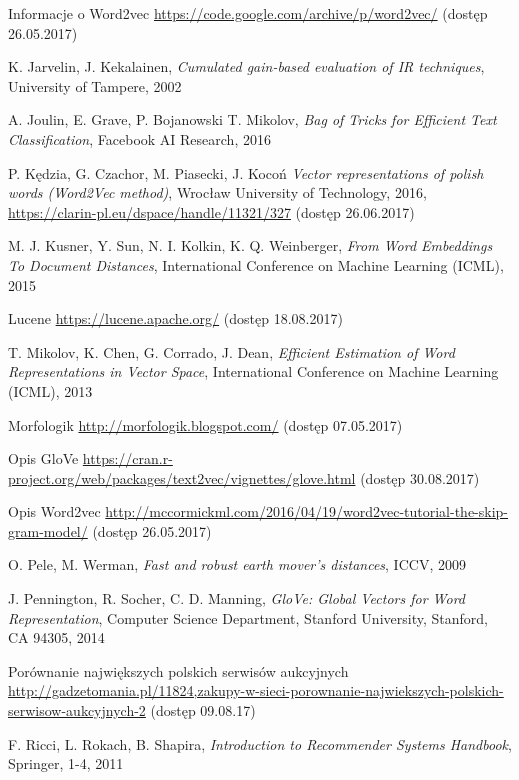 \documentclass[pl]{minipw} %
\begin{document}
\begin{thebibliography}{30}
		Informacje o Word2vec
		\url{https://code.google.com/archive/p/word2vec/}
		(dostęp 26.05.2017)
	
		K. Jarvelin, J. Kekalainen,
		\emph{Cumulated gain-based evaluation of IR techniques},
		University of Tampere,
		2002
	
		A. Joulin, E. Grave, P. Bojanowski T. Mikolov,
		\emph{Bag of Tricks for Efficient Text Classification},
		Facebook AI Research,
		2016
	
		P. Kędzia, G. Czachor, M. Piasecki, J. Kocoń
		\emph{Vector representations of polish words (Word2Vec method)},
		Wrocław University of Technology,
		2016,
		\url{https://clarin-pl.eu/dspace/handle/11321/327}
		(dostęp 26.06.2017)
	
		M. J. Kusner, Y. Sun, N. I. Kolkin, K. Q. Weinberger,
		\emph{From Word Embeddings To Document Distances},
		International Conference on Machine Learning (ICML),
		2015
	
		Lucene
		\url{https://lucene.apache.org/}
		(dostęp 18.08.2017)
	
		T. Mikolov, K. Chen, G. Corrado, J. Dean,
		\emph{Efficient Estimation of Word Representations in Vector Space},
		International Conference on Machine Learning (ICML),
		2013
	
		Morfologik
		\url{http://morfologik.blogspot.com/}
		(dostęp 07.05.2017)
	
		Opis GloVe
		\url{https://cran.r-project.org/web/packages/text2vec/vignettes/glove.html}
		(dostęp 30.08.2017)
	
		Opis Word2vec
		\url{http://mccormickml.com/2016/04/19/word2vec-tutorial-the-skip-gram-model/}
		(dostęp 26.05.2017)
	
		O. Pele, M. Werman,
		\emph{Fast and robust earth mover's distances},
		ICCV,
		2009
	
		J. Pennington, R. Socher, C. D. Manning,
		\emph{GloVe: Global Vectors for Word Representation},
		Computer Science Department, Stanford University, Stanford, CA 94305,
		2014
	
		Porównanie największych polskich serwisów aukcyjnych
		\url{http://gadzetomania.pl/11824,zakupy-w-sieci-porownanie-najwiekszych-polskich-serwisow-aukcyjnych-2}
		(dostęp 09.08.17)
	
		F. Ricci, L. Rokach, B. Shapira,
		\emph{Introduction to Recommender Systems Handbook},
		Springer,
		1-4,
		2011
		

\end{thebibliography}
\end{document}
